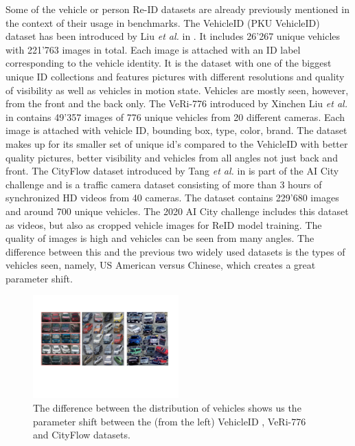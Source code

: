 \documentclass[conference]{IEEEtran} %
\begin{document}
		Some of the vehicle or person Re-ID datasets are already previously mentioned in the context of their usage in benchmarks. The VehicleID (PKU VehicleID) dataset has been introduced by Liu \textit{et al.} in \cite{liu2016deep}. It includes 26'267 unique vehicles with 221'763 images in total. Each image is attached with an ID label corresponding to the vehicle identity. It is the dataset with one of the biggest unique ID collections and features pictures with different resolutions and quality of visibility as well as vehicles in motion state. Vehicles are mostly seen, however, from the front and the back only. The VeRi-776 introduced by Xinchen Liu \textit{et al.} in \cite{liu2016deep2} contains 49'357 images of 776 unique vehicles from 20 different cameras. Each image is attached with vehicle ID, bounding box, type, color, brand. The dataset makes up for its smaller set of unique id's compared to the VehicleID with better quality pictures, better visibility and vehicles from all angles not just back and front. The CityFlow dataset introduced by Tang \textit{et al.} in \cite{tang2019cityflow} is part of the AI City challenge and is a traffic camera dataset consisting of more than 3 hours of synchronized HD videos from 40 cameras. The dataset contains 229'680 images and around 700 unique vehicles. The 2020 AI City challenge \cite{aicity2020data} includes this dataset as videos, but also as cropped vehicle images for ReID model training. The quality of images is high and vehicles can be seen from many angles. The difference between this and the previous two widely used datasets is the types of vehicles seen, namely, US American versus Chinese, which creates a great parameter shift.
	
	 \begin{figure}[t]
		\centering
		\includegraphics[width=0.5\textwidth]{re_id_diagramma_2.png} %
		\caption{The difference between the distribution of vehicles shows us the parameter shift between the (from the left) VehicleID \cite{liu2016deep}, VeRi-776 \cite{liu2016deep2} and CityFlow datasets.}
		\label{fig:fig2} %
	\end{figure}
	
\end{document}
